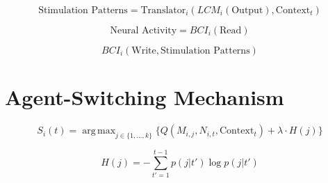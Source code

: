 \documentclass[12pt, a4paper]{article}
\DeclareMathOperator*{\argmax}{arg\,max}
\begin{document}
\begin{equation}
\text{Stimulation Patterns} = \text{Translator}_i(LCM_i(\text{Output}), \text{Context}_t)
\end{equation}

\begin{equation}
\text{Neural Activity} = BCI_i(\text{Read})
\end{equation}

\begin{equation}
BCI_i(\text{Write}, \text{Stimulation Patterns})
\end{equation}

\section{Agent-Switching Mechanism}

\begin{equation}
S_i(t) = \argmax_{j \in \{1, \dots, k\}} \{Q(M_{i,j}, N_{i,t}, \text{Context}_t) + \lambda \cdot H(j)\}
\end{equation}

\begin{equation}
H(j) = -\sum_{t'=1}^{t-1} p(j|t') \log p(j|t')
\end{equation}
\end{document}
